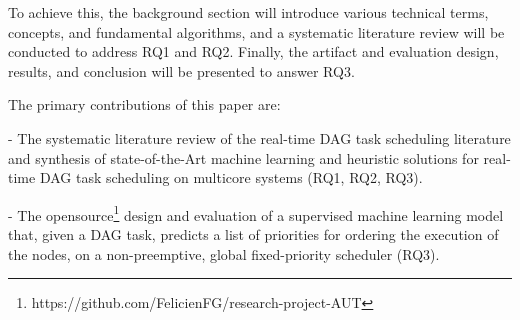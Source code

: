 To achieve this, the background section will introduce various 
technical terms, concepts, and fundamental algorithms, and
a systematic literature review will be conducted to address RQ1 and RQ2. 
Finally, the artifact and evaluation design, results, and conclusion will 
be presented to answer RQ3.

The primary contributions of this paper are: 
\begin{list}{}{}
    \item - The systematic literature review of the real-time DAG task scheduling
    literature and synthesis of state-of-the-Art machine learning and heuristic solutions 
    for real-time DAG task scheduling on multicore systems (RQ1, RQ2, RQ3).
    \item - The opensource\footnote{https://github.com/FelicienFG/research-project-AUT} design and evaluation of a supervised machine learning model
    that, given a DAG task, predicts a list of priorities for ordering the execution
    of the nodes, on a non-preemptive, global fixed-priority scheduler (RQ3).
\end{list}
